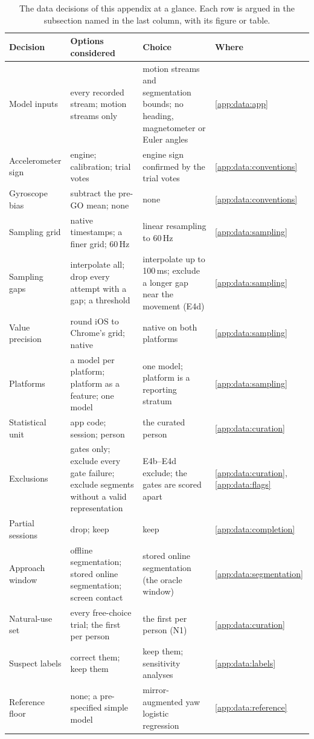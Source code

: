\begin{table}[htbp]
\centering
\caption{The data decisions of this appendix at a glance. Each row is argued in the subsection named in the
last column, with its figure or table.}\label{tab:app:data-decisions}
\footnotesize
\begin{tabularx}{\linewidth}{@{}>{\raggedright\arraybackslash}p{2.5cm}>{\raggedright\arraybackslash}X
  >{\raggedright\arraybackslash}X>{\raggedright\arraybackslash}p{1.9cm}@{}}
\toprule
Decision & Options considered & Choice & Where \\
\midrule
Model inputs & every recorded stream; motion streams only & motion streams and segmentation bounds; no heading,
  magnetometer or Euler angles & \ref{app:data:app} \\
Accelerometer sign & engine; calibration; trial votes & engine sign confirmed by the trial votes & \ref{app:data:conventions} \\
Gyroscope bias & subtract the pre-GO mean; none & none & \ref{app:data:conventions} \\
Sampling grid & native timestamps; a finer grid; 60\,Hz & linear resampling to 60\,Hz & \ref{app:data:sampling} \\
Sampling gaps & interpolate all; drop every attempt with a gap; a threshold & interpolate up to 100\,ms;
  exclude a longer gap near the movement (E4d) & \ref{app:data:sampling} \\
Value precision & round iOS to Chrome's grid; native & native on both platforms & \ref{app:data:sampling} \\
Platforms & a model per platform; platform as a feature; one model & one model; platform is a reporting
  stratum & \ref{app:data:sampling} \\
Statistical unit & app code; session; person & the curated person & \ref{app:data:curation} \\
Exclusions & gates only; exclude every gate failure; exclude segments without a valid representation &
  E4b--E4d exclude; the gates are scored apart & \ref{app:data:curation}, \ref{app:data:flags} \\
Partial sessions & drop; keep & keep & \ref{app:data:completion} \\
Approach window & offline segmentation; stored online segmentation; screen contact & stored online segmentation
  (the oracle window) & \ref{app:data:segmentation} \\
Natural-use set & every free-choice trial; the first per person & the first per person (N1) & \ref{app:data:curation} \\
Suspect labels & correct them; keep them & keep them; sensitivity analyses & \ref{app:data:labels} \\
Reference floor & none; a pre-specified simple model & mirror-augmented yaw logistic regression &
  \ref{app:data:reference} \\
\bottomrule
\end{tabularx}
\end{table}

